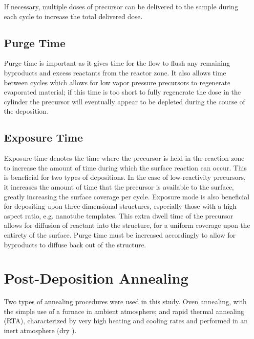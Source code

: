If necessary, multiple doses of precursor can be delivered to the sample during each cycle to increase the total delivered dose.


\subsection{Purge Time}

Purge time is important as it gives time for the  flow to flush any remaining byproducts and excess reactants from the reactor zone. It also allows time between cycles which allows for low vapor pressure precursors to regenerate evaporated material; if this time is too short to fully regenerate the dose in the cylinder the precursor will eventually appear to be depleted during the course of the deposition. 


\subsection{Exposure Time}

Exposure time denotes the time where the precursor is held in the reaction zone to increase the amount of time during which the surface reaction can occur. This is beneficial for two types of depositions. In the case of low-reactivity precursors, it increases the amount of time that the precursor is available to the surface, greatly increasing the surface coverage per cycle. Exposure mode is also beneficial for depositing upon three dimensional structures, especially those with a high aspect ratio, e.g. nanotube templates. This extra dwell time of the precursor allows for diffusion of reactant into the structure, for a uniform coverage upon the entirety of the surface. Purge time must be increased accordingly to allow for byproducts to diffuse back out of the structure. 


\section{Post-Deposition Annealing}
\label{sec:SampFab-Annealing}

Two types of annealing procedures were used in this study. Oven annealing, with the simple use of a furnace in ambient atmosphere; and rapid thermal annealing (RTA), characterized by very high heating and cooling rates and performed in an inert atmosphere (dry ). 


